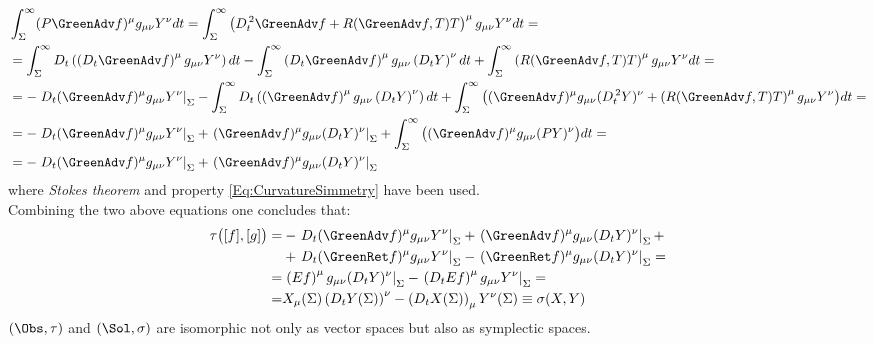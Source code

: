 \documentclass[Main]{subfiles}
\begin{document}
		\begin{align}
			&\int_\Sigma^\infty (P \GreenAdv f)^\mu g_{\mu \nu} Y^\nu dt = \int_\Sigma^\infty \left( D_t^{\,2} \GreenAdv f +R(\GreenAdv f,T)T \right)^\mu g_{\mu \nu} Y^\nu dt = \nonumber \\
			&= 
			 \int_\Sigma^\infty D_t \left( \left(D_t  \GreenAdv f \right)^\mu g_{\mu \nu} Y^\nu \right)dt -
			 \int_\Sigma^\infty \left( D_t  \GreenAdv f \right)^\mu g_{\mu \nu} \left( D_t Y \right)^\nu dt +
			 \int_\Sigma^\infty \left( R( \GreenAdv f,T)T \right)^\mu g_{\mu \nu} Y^\nu dt = \nonumber \\
			&= 
			 - \left. D_t( \GreenAdv f)^\mu g_{\mu \nu} Y^\nu \right\vert_\Sigma -
			 \int_\Sigma^\infty D_t \left( \left( \GreenAdv f \right)^\mu g_{\mu \nu} \left( D_t Y \right)^\nu \right)dt + \int_\Sigma^\infty \big(
			 (\GreenAdv f)^\mu g_{\mu \nu} (D_t^{\, 2}Y)^\nu + 
			 \left(R( \GreenAdv f,T)T \right)^\mu g_{\mu \nu} Y^\nu
			 \big) dt	=	 \nonumber \\
			 &=
			 -   \left. D_t( \GreenAdv f)^\mu g_{\mu \nu} Y^\nu \right\vert_\Sigma
			 +  \left. ( \GreenAdv f)^\mu g_{\mu \nu} (D_t Y)^\nu \right\vert_\Sigma
			 + \int_\Sigma^\infty \big(
			 (\GreenAdv f)^\mu g_{\mu \nu} (P Y)^\nu 
			 \big) dt =\nonumber \\
			 &= 
			 -   \left. D_t( \GreenAdv f)^\mu g_{\mu \nu} Y^\nu \right\vert_\Sigma
			 +  \left. ( \GreenAdv f)^\mu g_{\mu \nu} (D_t Y)^\nu \right\vert_\Sigma
		\end{align}
		where \emph{Stokes theorem} and property \ref{Eq:CurvatureSimmetry} have been used.
		\\
		Combining the two above equations one concludes that:
		\begin{align}
		\tau\big( [f], [g] \big) =& 
			 -   \left. D_t( \GreenAdv f)^\mu g_{\mu \nu} Y^\nu \right\vert_\Sigma
			 +  \left. ( \GreenAdv f)^\mu g_{\mu \nu} (D_t Y)^\nu \right\vert_\Sigma		+
		\nonumber \\
			&+ \left. D_t( \GreenRet f)^\mu g_{\mu \nu} Y^\nu \right\vert_\Sigma
			   -  \left. ( \GreenRet f)^\mu g_{\mu \nu} (D_t Y)^\nu \right\vert_\Sigma		
		 =  \nonumber\\
		=&\left. \left( E f \right)^\mu g_{\mu \nu} ( D_t Y)^\nu\right\vert_\Sigma	 
		-  \left.\left(D_t E f \right)^\mu g_{\mu \nu}  Y^\nu \right\vert_\Sigma	= \nonumber \\
		=& X_\mu(\Sigma) \left( D_t Y (\Sigma)\right)^\nu - \left(D_t X(\Sigma)\right)_\mu Y^\nu(\Sigma) \equiv \sigma( X, Y)
		\end{align}
		$(\Obs, \tau)$ and $(\Sol, \sigma)$ are isomorphic not only as vector spaces but also as symplectic spaces.
\end{document}
